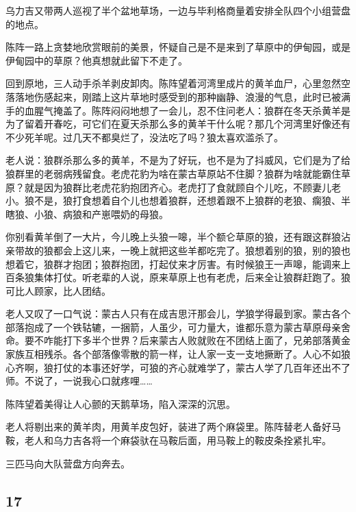 \par 乌力吉又带两人巡视了半个盆地草场，一边与毕利格商量着安排全队四个小组营盘的地点。
\par 陈阵一路上贪婪地欣赏眼前的美景，怀疑自己是不是来到了草原中的伊甸园，或是伊甸园中的草原？他真想就此留下不走了。
\par 回到原地，三人动手杀羊剥皮卸肉。陈阵望着河湾里成片的黄羊血尸，心里忽然空落落地伤感起来，刚踏上这片草地时感受到的那种幽静、浪漫的气息，此时已被满手的血腥气掩盖了。陈阵闷闷地想了一会儿，忍不住问老人：狼群在冬天杀黄羊是为了留着开春吃，可它们在夏天杀那么多的黄羊干什么呢？那几个河湾里好像还有不少死羊呢。过几天不都臭烂了，没法吃了吗？狼太喜欢滥杀了。
\par 老人说：狼群杀那么多的黄羊，不是为了好玩，也不是为了抖威风，它们是为了给狼群里的老弱病残留食。老虎花豹为啥在蒙古草原站不住脚？狼群为啥就能霸住草原？就是因为狼群比老虎花豹抱团齐心。老虎打了食就顾自个儿吃，不顾妻儿老小。狼不是，狼打食想着自个儿也想着狼群，还想着跟不上狼群的老狼、瘸狼、半瞎狼、小狼、病狼和产崽喂奶的母狼。
\par 你别看黄羊倒了一大片，今儿晚上头狼一嗥，半个额仑草原的狼，还有跟这群狼沾亲带故的狼都会上这儿来，一晚上就把这些羊都吃完了。狼想着别的狼，别的狼也想着它，狼群才抱团；狼群抱团，打起仗来才厉害。有时候狼王一声嗥，能调来上百条狼集体打仗。听老辈的人说，原来草原上也有老虎，后来全让狼群赶跑了。狼可比人顾家，比人团结。
\par 老人又叹了一口气说：蒙古人只有在成吉思汗那会儿，学狼学得最到家。蒙古各个部落抱成了一个铁轱辘，一捆箭，人虽少，可力量大，谁都乐意为蒙古草原母亲舍命。要不咋能打下多半个世界？后来蒙古人败就败在不团结上面了，兄弟部落黄金家族互相残杀。各个部落像零散的箭一样，让人家一支一支地撅断了。人心不如狼心齐啊，狼打仗的本事还好学，可狼的齐心就难学了，蒙古人学了几百年还出不了师。不说了，一说我心口就疼哩……
\par 陈阵望着美得让人心颤的天鹅草场，陷入深深的沉思。
\par 老人将剔出来的黄羊肉，用黄羊皮包好，装进了两个麻袋里。陈阵替老人备好马鞍，老人和乌力吉各将一个麻袋驮在马鞍后面，用马鞍上的鞍皮条拴紧扎牢。
\par 三匹马向大队营盘方向奔去。




\subsection*{17}


